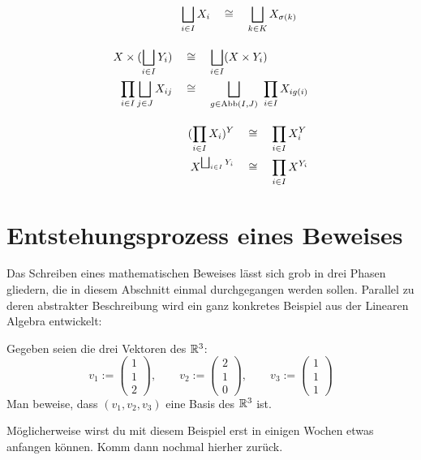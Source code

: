 \begin{align*}
\begin{split}
    \bigsqcup_{i\in I} X_i & \quad\cong\quad \bigsqcup_{k\in K} X_{\sigma(k)}
    \end{split} \\[1em]
    \begin{split}
        X \times (\bigsqcup_{i\in I} Y_i) & \quad\cong\quad \bigsqcup_{i\in I} (X\times Y_i) \\
        \prod_{i\in I} \bigsqcup_{j\in J} X_{ij} & \quad\cong\quad \bigsqcup_{g\in \operatorname{Abb}(I,J)}\ \prod_{i\in I} X_{ig(i)}
    \end{split} \\[1em]
    \begin{split}
        (\prod_{i\in I} X_i)^Y & \quad\cong\quad \prod_{i\in I} X_i^Y \\
        X^{\bigsqcup_{i\in I} Y_i} & \quad\cong\quad \prod_{i\in I} X^{Y_i}
    \end{split}
\end{align*}
\endgroup





\chapter{Entstehungsprozess eines Beweises} \label{entstehungsprozess}


Das Schreiben eines mathematischen Beweises lässt sich grob in drei Phasen gliedern, die in diesem Abschnitt einmal durchgegangen werden sollen. Parallel zu deren abstrakter Beschreibung wird ein ganz konkretes Beispiel aus der Linearen Algebra entwickelt:


\begin{aufg}
    Gegeben seien die drei Vektoren des $\mathbb R^3$:
        \[ v_1:= \begin{pmatrix} 1 \\ 1 \\ 2 \end{pmatrix},\qquad  v_2:= \begin{pmatrix} 2 \\ 1 \\ 0 \end{pmatrix},\qquad v_3:= \begin{pmatrix} 1 \\ 1 \\ 1 \end{pmatrix}\]
    Man beweise, dass $(v_1,v_2,v_3)$ eine Basis des $\mathbb R^3$ ist.
\end{aufg}


Möglicherweise wirst du mit diesem Beispiel erst in einigen Wochen etwas anfangen können. Komm dann nochmal hierher zurück.


